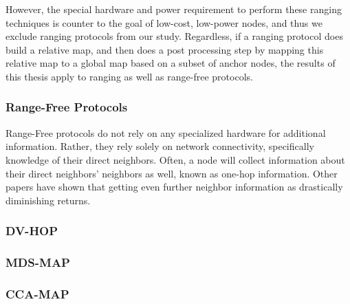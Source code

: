 However, the special hardware and power requirement to perform these ranging techniques is counter to the goal of low-cost, low-power nodes, and thus we exclude ranging protocols from our study.  Regardless, if a ranging protocol does build a relative map, and then does a post processing step by mapping this relative map to a global map based on a subset of anchor nodes, the results of this thesis apply to ranging as well as range-free protocols.

\subsubsection{Range-Free Protocols}
Range-Free protocols do not rely on any specialized hardware for additional information.  Rather, they rely solely on network connectivity, specifically knowledge of their direct neighbors.  Often, a node will collect information about their direct neighbors' neighbors as well, known as one-hop information.  Other papers have shown that getting even further neighbor information as drastically diminishing returns.  


\subsubsection{DV-HOP}
\cite{DV-HOP}

\subsubsection{MDS-MAP}
\cite{MDS-MAP}

\subsubsection{CCA-MAP}
\cite{CCA-MAP}
